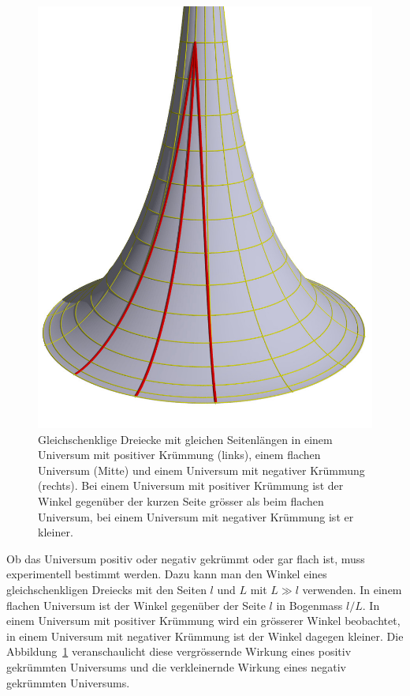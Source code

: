 \begin{figure}
\includegraphics[height=6truecm]{chapters/3d/negativ.jpg}
\caption{Gleichschenklige Dreiecke mit gleichen Seitenlängen in einem
Universum mit positiver Krümmung (links), einem flachen Universum (Mitte)
und einem Universum mit negativer Krümmung (rechts).
Bei einem Universum mit positiver Krümmung ist der Winkel gegenüber
der kurzen Seite grösser als beim flachen Universum, bei einem
Universum mit negativer Krümmung ist er kleiner.
\label{skript:robertson:vergroesserung}}
\end{figure}
Ob das Universum positiv oder negativ gekrümmt oder gar flach ist,
muss experimentell bestimmt werden.
Dazu kann man den Winkel eines gleichschenkligen Dreiecks mit den
Seiten $l$ und $L$ mit $L\gg l$ verwenden.
In einem flachen Universum ist der Winkel gegenüber der Seite $l$
in Bogenmass $l/L$.
In einem Universum mit positiver Krümmung wird ein grösserer Winkel
beobachtet, in einem Universum mit negativer Krümmung ist der Winkel
dagegen kleiner.
Die Abbildung~\ref{skript:robertson:vergroesserung} veranschaulicht
diese vergrössernde Wirkung eines positiv gekrümmten Universums
und die verkleinernde Wirkung eines negativ gekrümmten Universums.

